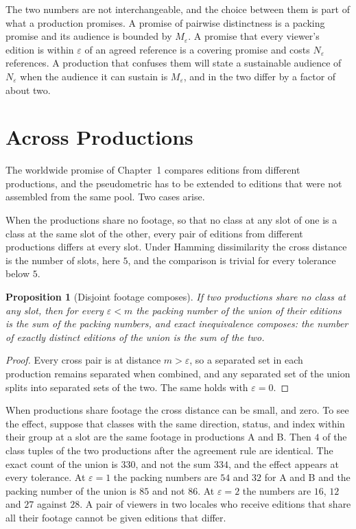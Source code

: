\documentclass[11pt,twoside,openright]{book}
\theoremstyle{plain}
\newtheorem{proposition}[theorem]{Proposition}
\theoremstyle{definition}
\theoremstyle{remark}
\begin{document}
The two numbers are not interchangeable, and the choice between them is part of what a production promises. A promise of pairwise distinctness is a packing promise and its audience is bounded by $M_\varepsilon$. A promise that every viewer's edition is within $\varepsilon$ of an agreed reference is a covering promise and costs $N_\varepsilon$ references. A production that confuses them will state a sustainable audience of $N_\varepsilon$ when the audience it can sustain is $M_\varepsilon$, and in  the two differ by a factor of about two.

\section{Across Productions}\label{sec:across}

The worldwide promise of Chapter~1 compares editions from different productions, and the pseudometric has to be extended to editions that were not assembled from the same pool. Two cases arise.

When the productions share no footage, so that no class at any slot of one is a class at the same slot of the other, every pair of editions from different productions differs at every slot. Under Hamming dissimilarity the cross distance is the number of slots, here $5$, and the comparison is trivial for every tolerance below $5$.

\begin{proposition}[Disjoint footage composes]\label{prop:disjoint}
If two productions share no class at any slot, then for every $\varepsilon<m$ the packing number of the union of their editions is the sum of the packing numbers, and exact inequivalence composes: the number of exactly distinct editions of the union is the sum of the two.
\end{proposition}

\begin{proof}
Every cross pair is at distance $m>\varepsilon$, so a separated set in each production remains separated when combined, and any separated set of the union splits into separated sets of the two. The same holds with $\varepsilon=0$.
\end{proof}

When productions share footage the cross distance can be small, and zero. To see the effect, suppose that classes with the same direction, status, and index within their group at a slot are the same footage in productions A and B. Then $4$ of the class tuples of the two productions after the agreement rule are identical. The exact count of the union is $330$, and not the sum $334$, and the effect appears at every tolerance. At $\varepsilon=1$ the packing numbers are $54$ and $32$ for A and B and the packing number of the union is $85$ and not $86$. At $\varepsilon=2$ the numbers are $16$, $12$ and $27$ against $28$. A pair of viewers in two locales who receive editions that share all their footage cannot be given editions that differ.
\end{document}
